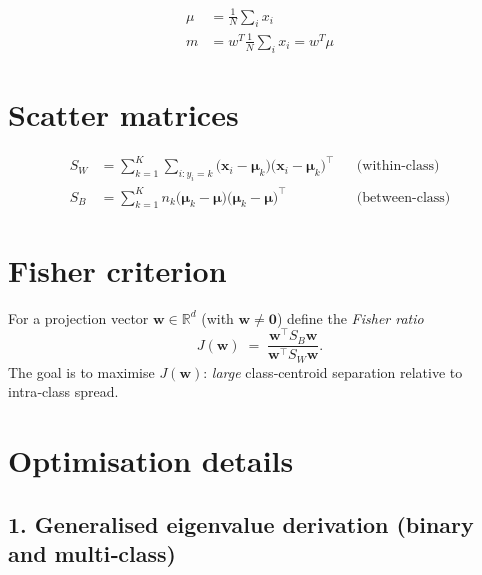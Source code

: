 \begin{align*}
	\mu &= \frac{1}{N}\sum_i x_i\\
	m &= w^T\frac{1}{N}\sum_i x_i = w^T\mu
\end{align*}




\section{Scatter matrices}

\begin{align*}
S_W &=\sum_{k=1}^{K}\sum_{i:y_i=k}\bigl(\mathbf x_i-\boldsymbol\mu_k\bigr)
                            \bigl(\mathbf x_i-\boldsymbol\mu_k\bigr)^{\!\top}
      &&\text{(within‑class)}\\[4pt]
S_B &=\sum_{k=1}^{K}n_k\bigl(\boldsymbol\mu_k-\boldsymbol\mu\bigr)
                       \bigl(\boldsymbol\mu_k-\boldsymbol\mu\bigr)^{\!\top}
      &&\text{(between‑class)}
\end{align*}

\section{Fisher criterion}

For a projection vector $\mathbf w\in\mathbb R^{d}$ (with $\mathbf w\neq\mathbf 0$) define the
\emph{Fisher ratio}
\[
J(\mathbf w)\;=\;
\frac{\mathbf w^{\top}S_B\mathbf w}{\mathbf w^{\top}S_W\mathbf w}.
\]
The goal is to maximise $J(\mathbf w)$: \emph{large} class‑centroid separation relative to
intra‑class spread.

\section{Optimisation details}

\subsection*{1.\; Generalised eigenvalue derivation (binary and multi‐class)}

